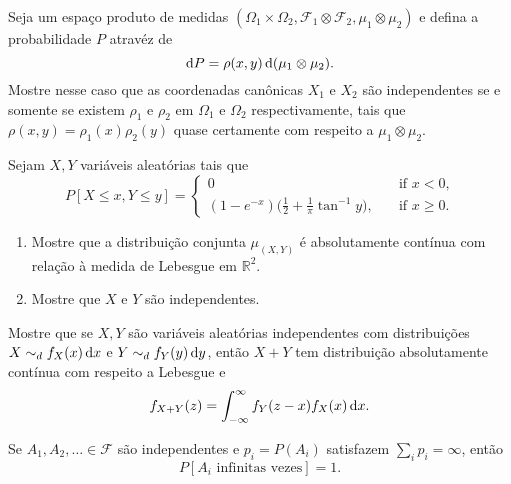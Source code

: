 \begin{exercise}
  Seja um espaço produto de medidas $(\Omega_1 \times \Omega_2, \mathcal{F}_1 \otimes \mathcal{F}_2, \mu_1 \otimes \mu_2)$ e defina a probabilidade $P$ atravéz de
  \begin{equation}
    \mathop{}\!\mathrm{d} P = \rho(x,y) \mathop{}\!\mathrm{d} (\mu_1 \otimes \mu_2).
  \end{equation}
  Mostre nesse caso que as coordenadas canônicas $X_1$ e $X_2$ são independentes se e somente se existem $\rho_1$ e $\rho_2$ em $\Omega_1$ e $\Omega_2$ respectivamente, tais que $\rho(x,y) = \rho_1(x) \rho_2(y)$ quase certamente com respeito a $\mu_1 \otimes \mu_2$.
\end{exercise}

\begin{exercise}
  Sejam $X, Y$ vari\'aveis aleat\'orias tais que
  \begin{equation}
    P[X \leq x, Y \leq y] =
    \begin{cases}
      0 & \quad \text{if $x < 0$,}\\
      (1-e^{-x}) \Big(\frac 12 + \frac 1\pi \tan^{-1} y \Big), & \quad \text{if $x \geq 0$}.
    \end{cases}
  \end{equation}
  \begin{enumerate}[\quad a)]
  \item Mostre que a distribui\c{c}\~ao conjunta $\mu_{(X,Y)}$ \'e
    absolutamente cont\'inua com rela\c{c}\~ao \`a medida de Lebesgue em
    $\mathbb{R}^2$.
  \item Mostre que $X$ e $Y$ s\~ao independentes.
  \end{enumerate}
\end{exercise}

\begin{exercise}
  \label{x:convolucao_densidade}
  Mostre que se $X, Y$ são variáveis aleatórias independentes com distribuições $X \sim_d f_X(x) \mathop{}\!\mathrm{d} x$ e $Y \sim_d f_Y(y) \mathop{}\!\mathrm{d} y$, então $X + Y$ tem distribuição absolutamente contínua com respeito a Lebesgue e
  \begin{equation}
    f_{X + Y}(z) = \int_{-\infty}^\infty f_Y(z - x) f_X(x) \mathop{}\!\mathrm{d} x.
  \end{equation}
\end{exercise}


\begin{lemma}
  Se $A_1, A_2, \dots \in \mathcal{F}$ são independentes e $p_i = P(A_i)$ satisfazem $\sum_i p_i = \infty$, então
  \begin{equation}
    P[A_i \text{ infinitas vezes}] = 1.
  \end{equation}
\end{lemma}

